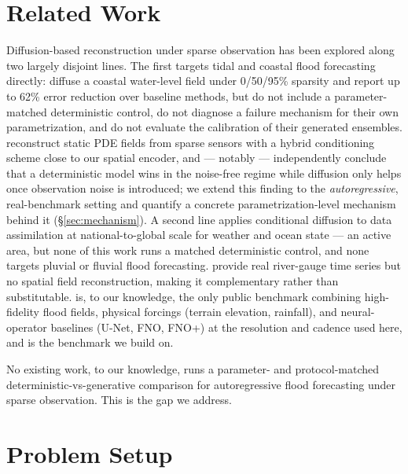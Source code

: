 \documentclass[11pt]{article}
\begin{document}
\section{Related Work}
\label{sec:related}

Diffusion-based reconstruction under sparse observation has been explored
along two largely disjoint lines. The first targets tidal and coastal
flood forecasting directly: \citet{diffsparse2025} diffuse a coastal
water-level field under 0/50/95\% sparsity and report up to 62\% error
reduction over baseline methods, but do not include a parameter-matched
deterministic control, do not diagnose a failure mechanism for their own
parametrization, and do not evaluate the calibration of their generated
ensembles. \citet{spatiallyawarediffusion2024} reconstruct static PDE
fields from sparse sensors with a hybrid conditioning scheme close to our
spatial encoder, and --- notably --- independently conclude that a
deterministic model wins in the noise-free regime while diffusion only
helps once observation noise is introduced; we extend this finding to the
\emph{autoregressive}, real-benchmark setting and quantify a concrete
parametrization-level mechanism behind it (\S\ref{sec:mechanism}). A second
line applies conditional diffusion to data assimilation at
national-to-global scale for weather and ocean state
\citep{jamesstations2025,jamesocean2025,phyda2025} --- an active area, but
none of this work runs a matched deterministic control, and none targets
pluvial or fluvial flood forecasting. \citet{sf2bench2025} provide real
river-gauge time series but no spatial field reconstruction, making it
complementary rather than substitutable. \citet{floodcastbench2025} is, to
our knowledge, the only public benchmark combining high-fidelity flood
fields, physical forcings (terrain elevation, rainfall), and
neural-operator baselines (U-Net, FNO, FNO+) at the resolution and cadence
used here, and is the benchmark we build on.

No existing work, to our knowledge, runs a parameter- and protocol-matched
deterministic-vs-generative comparison for autoregressive flood forecasting
under sparse observation. This is the gap we address.

\section{Problem Setup}
\label{sec:setup}
\end{document}
